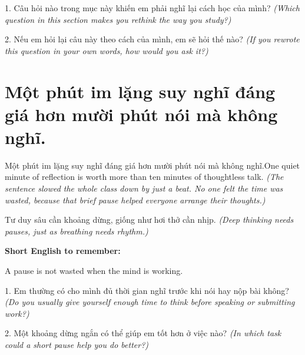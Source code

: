 \begin{tuhocnhanh}
1. Câu hỏi nào trong mục này khiến em phải nghĩ lại cách học của mình? \textit{(Which question in this section makes you rethink the way you study?)}

2. Nếu em hỏi lại câu này theo cách của mình, em sẽ hỏi thế nào? \textit{(If you rewrote this question in your own words, how would you ask it?)}
\end{tuhocnhanh}
\ngancach


\section{Một phút im lặng suy nghĩ đáng giá hơn mười phút nói mà không nghĩ.}
\begin{truyen}{Một phút im lặng suy nghĩ đáng giá hơn mười phút nói mà không nghĩ.}{One quiet minute of reflection is worth more than ten minutes of thoughtless talk.}
\textit{(The sentence slowed the whole class down by just a beat. No one felt the time was wasted, because that brief pause helped everyone arrange their thoughts.)}
\end{truyen}

\begin{baihoc}
Tư duy sâu cần khoảng dừng, giống như hơi thở cần nhịp.
\textit{(Deep thinking needs pauses, just as breathing needs rhythm.)}
\end{baihoc}

\begin{ghinhoanh}
\textbf{Short English to remember:}

A pause is not wasted when the mind is working.

\end{ghinhoanh}

\begin{tuhocnhanh}
1. Em thường có cho mình đủ thời gian nghĩ trước khi nói hay nộp bài không? \textit{(Do you usually give yourself enough time to think before speaking or submitting work?)}

2. Một khoảng dừng ngắn có thể giúp em tốt hơn ở việc nào? \textit{(In which task could a short pause help you do better?)}
\end{tuhocnhanh}
\ngancach
